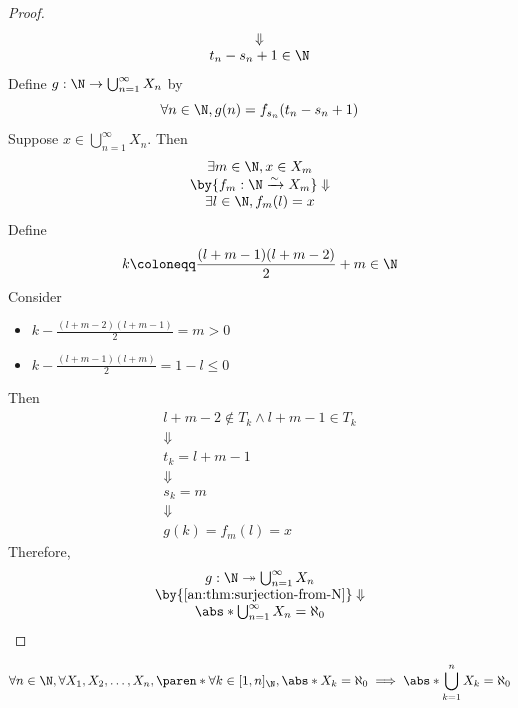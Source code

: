 \begin{proof}
\[\begin{array}{c}
      \Downarrow                                             \\
      t_{n} - s_{n} + 1 \in \N
    \end{array}
  \]
  Define $g: \N \to \bigcup_{n = 1}^{\infty} X_{n}$ by
  \[
    \forall n \in \N, g(n) = f_{s_{n}}(t_{n} - s_{n} + 1)
  \]
  Suppose $x \in \bigcup_{n = 1}^{\infty} X_{n}$. Then
  \[
    \begin{array}{c}
      \exists m \in \N, x \in X_{m}                                   \\
      \by{\ensuremath{f_{m}: \N \xrightarrow{\sim} X_{m}}} \Downarrow \\
      \exists l \in \N, f_{m}(l) = x                                  \\
    \end{array}
  \]
  Define
  \[
    k \coloneqq \frac{(l + m - 1)(l + m - 2)}{2} + m \in \N
  \]
  Consider
  \begin{itemize}
    \item $k - \frac{(l + m - 2)(l + m - 1)}{2} = m > 0$
    \item $k - \frac{(l + m - 1)(l + m)}{2} = 1 - l \leq 0$
  \end{itemize}
  Then
  \[
    \begin{array}{c}
      l + m - 2 \notin T_{k} \land l + m - 1 \in T_{k} \\
      \Downarrow                                       \\
      t_{k} = l + m - 1                                \\
      \Downarrow                                       \\
      s_{k} = m                                        \\
      \Downarrow                                       \\
      g(k) = f_{m}(l) = x
    \end{array}
  \]
  Therefore,
  \[
    \begin{array}{c}
      g: \N \twoheadrightarrow \bigcup_{n = 1}^{\infty} X_{n} \\
      \by{\Cref{an:thm:surjection-from-N}} \Downarrow         \\
      \abs*{\bigcup_{n = 1}^{\infty} X_{n}} = \aleph_{0}
    \end{array}
  \]
\end{proof}

\bigskip

\begin{corollary} \label{an:cor:finite-union-of-countable-sets-is-countable}
  \[
    \forall n \in \N, \forall X_{1}, X_{2}, \ldots, X_{n},
    \paren*{\forall k \in [1, n]_{\N}, \abs*{X_{k}} = \aleph_{0}}
    \implies \abs*{\bigcup_{k = 1}^{n} X_{k}} = \aleph_{0}
  \]
\end{corollary}

